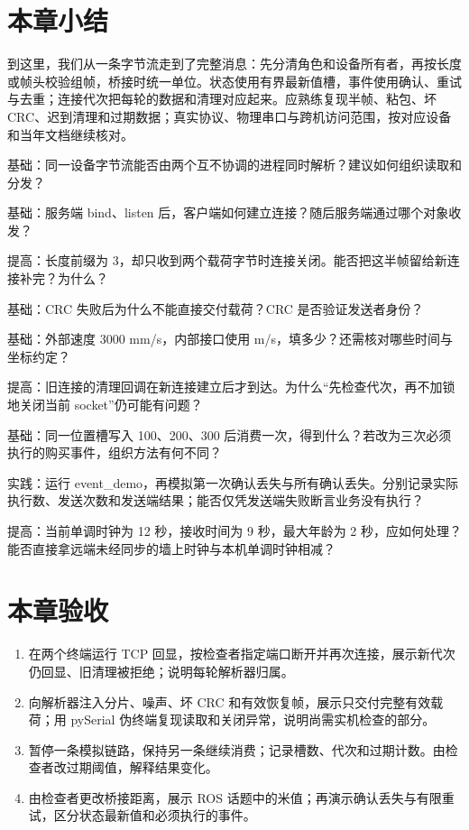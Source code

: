 \section{本章小结}
到这里，我们从一条字节流走到了完整消息：先分清角色和设备所有者，再按长度或帧头校验组帧，桥接时统一单位。状态使用有界最新值槽，事件使用确认、重试与去重；连接代次把每轮的数据和清理对应起来。应熟练复现半帧、粘包、坏 CRC、迟到清理和过期数据；真实协议、物理串口与跨机访问范围，按对应设备和当年文档继续核对。

\begin{problemset}
\renewcommand{\theenumi}{\arabic{enumi}}
\item \label{prob:v2-comm-1}基础：同一设备字节流能否由两个互不协调的进程同时解析？建议如何组织读取和分发？
\item \label{prob:v2-comm-2}基础：服务端 bind、listen 后，客户端如何建立连接？随后服务端通过哪个对象收发？
\item \label{prob:v2-comm-3}提高：长度前缀为 3，却只收到两个载荷字节时连接关闭。能否把这半帧留给新连接补完？为什么？
\item \label{prob:v2-comm-4}基础：CRC 失败后为什么不能直接交付载荷？CRC 是否验证发送者身份？
\item \label{prob:v2-comm-5}基础：外部速度 3000 mm/s，内部接口使用 m/s，填多少？还需核对哪些时间与坐标约定？
\item \label{prob:v2-comm-6}提高：旧连接的清理回调在新连接建立后才到达。为什么“先检查代次，再不加锁地关闭当前 socket”仍可能有问题？
\item \label{prob:v2-comm-7}基础：同一位置槽写入 100、200、300 后消费一次，得到什么？若改为三次必须执行的购买事件，组织方法有何不同？
\item \label{prob:v2-comm-8}实践：运行 event\_demo，再模拟第一次确认丢失与所有确认丢失。分别记录实际执行数、发送次数和发送端结果；能否仅凭发送端失败断言业务没有执行？
\item \label{prob:v2-comm-9}提高：当前单调时钟为 12 秒，接收时间为 9 秒，最大年龄为 2 秒，应如何处理？能否直接拿远端未经同步的墙上时钟与本机单调时钟相减？
\end{problemset}

\section{本章验收}
\begin{enumerate}
\item 在两个终端运行 TCP 回显，按检查者指定端口断开并再次连接，展示新代次仍回显、旧清理被拒绝；说明每轮解析器归属。
\item 向解析器注入分片、噪声、坏 CRC 和有效恢复帧，展示只交付完整有效载荷；用 pySerial 伪终端复现读取和关闭异常，说明尚需实机检查的部分。
\item 暂停一条模拟链路，保持另一条继续消费；记录槽数、代次和过期计数。由检查者改过期阈值，解释结果变化。
\item 由检查者更改桥接距离，展示 ROS 话题中的米值；再演示确认丢失与有限重试，区分状态最新值和必须执行的事件。
\end{enumerate}
